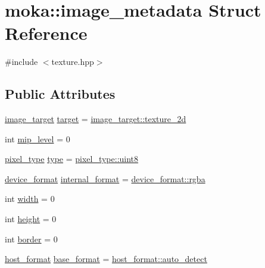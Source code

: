 \hypertarget{structmoka_1_1image__metadata}{}\section{moka\+::image\+\_\+metadata Struct Reference}
\label{structmoka_1_1image__metadata}


{\ttfamily \#include $<$texture.\+hpp$>$}

\subsection*{Public Attributes}
\begin{DoxyCompactItemize}
\item 
\mbox{\hyperlink{namespacemoka_a6f402ae62a72ce17ff73fa94d526800e}{image\+\_\+target}} \mbox{\hyperlink{structmoka_1_1image__metadata_a6ae2456df2d95e2c67e255dc837465a4}{target}} = \mbox{\hyperlink{namespacemoka_a259bf395c8f07bd8d13515efcb542623ade86992194d08494a0a0e208a3660f31}{image\+\_\+target\+::texture\+\_\+2d}}
\item 
int \mbox{\hyperlink{structmoka_1_1image__metadata_abe30b703008614451bce6940131fda56}{mip\+\_\+level}} = 0
\item 
\mbox{\hyperlink{namespacemoka_a067d388d48715c4e725cd426d5bf3770}{pixel\+\_\+type}} \mbox{\hyperlink{structmoka_1_1image__metadata_adb23e7386e2e515b137f9282770a2819}{type}} = \mbox{\hyperlink{namespacemoka_a32244b0de63481283738e2db11639e3fa5f423e669d0a8f4ab7c4c3e6da27161a}{pixel\+\_\+type\+::uint8}}
\item 
\mbox{\hyperlink{namespacemoka_ac2d188857be60286ff735744a33ebd2d}{device\+\_\+format}} \mbox{\hyperlink{structmoka_1_1image__metadata_a7e85b6310af81237d51de1eb79f70ac7}{internal\+\_\+format}} = \mbox{\hyperlink{namespacemoka_a1989c05aecf3bb10bbf8a7027e3df130a7082a31b8759c9d59795876351ec63aa}{device\+\_\+format\+::rgba}}
\item 
int \mbox{\hyperlink{structmoka_1_1image__metadata_a8172657e9eff1d1b405268b99fad312f}{width}} = 0
\item 
int \mbox{\hyperlink{structmoka_1_1image__metadata_a6d40b774cab668f1bdea19f536fdb5c9}{height}} = 0
\item 
int \mbox{\hyperlink{structmoka_1_1image__metadata_a4a38c38e7146b251e07203a251bba98a}{border}} = 0
\item 
\mbox{\hyperlink{namespacemoka_a1989c05aecf3bb10bbf8a7027e3df130}{host\+\_\+format}} \mbox{\hyperlink{structmoka_1_1image__metadata_a5a9e5497fdf4bbff04788b281e5092ab}{base\+\_\+format}} = \mbox{\hyperlink{namespacemoka_a1989c05aecf3bb10bbf8a7027e3df130a60db33599fbe80f2d536ce9ffb5f2377}{host\+\_\+format\+::auto\+\_\+detect}}
\end{DoxyCompactItemize}


